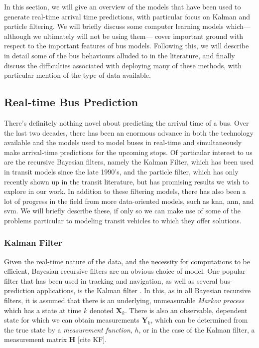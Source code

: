 \documentclass[12pt,a4paper]{article}
\newcommand{\bY}{\mathbf{Y}}
\newcommand{\bX}{\mathbf{X}}
\newcommand{\mat}[1]{\mathbf{#1}}
\newcommand{\kf}{Kalman filter}
\begin{document}
In this section, we will give an overview of the models that have been used
to generate real-time arrival time predictions,
with particular focus on Kalman and particle filtering.
We will briefly discuss some computer learning models which---%
although we ultimately will not be using them---%
cover important ground with respect to the important features of bus models.
Following this, we will describe in detail some of the
bus behaviours alluded to in the literature,
and finally discuss the difficulties associated with deploying many of these methods,
with particular mention of the type of data available.


\subsection{Real-time Bus Prediction}
\label{sec:history}

There's definitely nothing novel about predicting the arrival time of a bus.
Over the last two decades,
there has been an enormous advance in both the technology available and the models used
to model buses in real-time and simultaneously make arrival-time predictions for the upcoming stops.
Of particular interest to us are the recursive Bayesian filters,
namely the Kalman Filter, which has been used in transit models since the late 1990's,
and the particle filter, which has only recently shown up in the transit literature,
but has promising results we wish to explore in our work.
In addition to these filtering models,
there has also been a lot of progress in the field from more data-oriented models,
such as \gls{knn}, \gls{ann}, and \gls{svm}.
We will briefly describe these, if only so we can make use of some of the problems
particular to modeling transit vehicles to which they offer solutions.



\subsubsection{Kalman Filter}
\label{sec:kalman-filter}

Given the real-time nature of the data, and the necessity for computations to be efficient,
Bayesian recursive filters are an obvious choice of model.
One popular filter that has been used in tracking and navigation,
as well as several bus-prediction applications,
is the \kf{} \citep{wall-dailey:1999,dailey:2001,cn}.
In this, as in all Bayesian recursive filters,
it is assumed that there is an underlying, unmeasurable \emph{Markov process}
which has a state at time $k$ denoted $\bX_k$.
There is also an observable, dependent state for which we can obtain measurements $\bY_k$,
which can be determined from the true state by a \emph{measurement function}, $h$,
or in the case of the \kf{}, a measurement matrix $\mat{H}$
\citep{cn} [cite KF].
\end{document}

